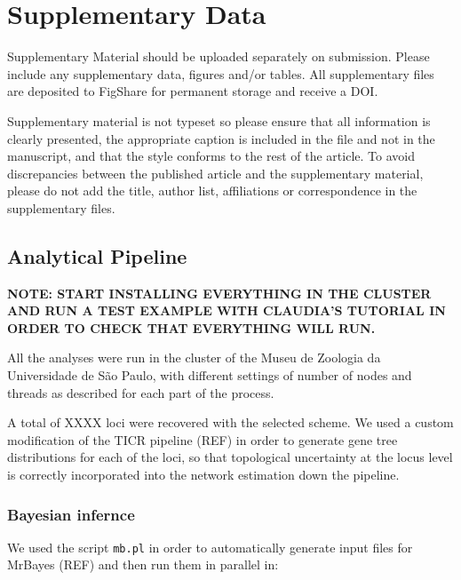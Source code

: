 \documentclass[utf8]{frontiers_suppmat} %
\begin{document}
\onecolumn
{}

\title[Supplementary Material]{{}}


\maketitle


\section{Supplementary Data}

Supplementary Material should be uploaded separately on submission. Please include any supplementary data, figures and/or tables. All supplementary files are deposited to FigShare for permanent storage and receive a DOI.

Supplementary material is not typeset so please ensure that all information is clearly presented, the appropriate caption is included in the file and not in the manuscript, and that the style conforms to the rest of the article. To avoid discrepancies between the published article and the supplementary material, please do not add the title, author list, affiliations or correspondence in the supplementary files.

\subsection{Analytical Pipeline}

\textbf{NOTE: START INSTALLING EVERYTHING IN THE CLUSTER AND RUN A TEST EXAMPLE WITH CLAUDIA'S TUTORIAL IN ORDER TO CHECK THAT EVERYTHING WILL RUN.}

All the analyses were run in the cluster of the Museu de Zoologia da Universidade de S\~{a}o Paulo, with different settings of number of nodes and threads as described for each part of the process.

A total of XXXX loci were recovered with the selected scheme. We used a custom modification of the TICR pipeline (REF) in order to generate gene tree distributions for each of the loci, so that topological uncertainty at the locus level is correctly incorporated into the network estimation down the pipeline.

\subsubsection{Bayesian infernce}

We used the script \texttt{mb.pl} in order to automatically generate input files for MrBayes (REF) and then run them in parallel in:
\end{document}
